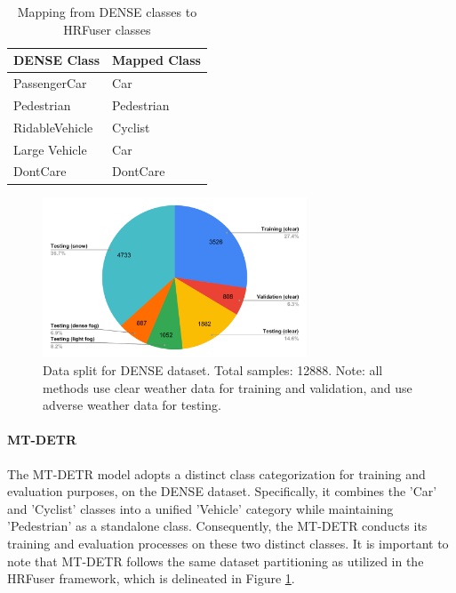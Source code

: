 \documentclass[report.tex]{subfiles}
\begin{document}
\begin{itemize}
            \begin{table}[h]
                \centering
                \caption{Mapping from DENSE classes to HRFuser classes \cite{broedermann2022hrfuser}}
                \begin{tabular}{|l|l|}
                \hline
                \textbf{DENSE Class} & \textbf{Mapped Class} \\ \hline
                PassengerCar         & Car                   \\ \hline
                Pedestrian           & Pedestrian            \\ \hline
                RidableVehicle       & Cyclist               \\ \hline
                Large Vehicle        & Car                   \\ \hline
                DontCare             & DontCare              \\ \hline
                \end{tabular}
                
                \label{tab:hrfuser_classes_dense}
            \end{table}

            \begin{figure}[h!]
                \centering
                \includegraphics[width=0.7\textwidth]{images/datasets/dense/dataset_split.pdf}
                \caption{Data split for DENSE dataset. Total samples: 12888. Note: all methods use clear weather data for training and validation, and use adverse weather data for testing.}
                \label{fig:hrfuser_data_split_dense}
            \end{figure}

            \paragraph*{MT-DETR}

            The MT-DETR model adopts a distinct class categorization for training and evaluation purposes, on the DENSE dataset. Specifically, it combines the 'Car' and 'Cyclist' classes into a unified 'Vehicle' category while maintaining 'Pedestrian' as a standalone class. Consequently, the MT-DETR conducts its training and evaluation processes on these two distinct classes. It is important to note that MT-DETR follows the same dataset partitioning as utilized in the HRFuser framework, which is delineated in Figure \ref{fig:hrfuser_data_split_dense}.

                
        \end{itemize}
\end{document}
